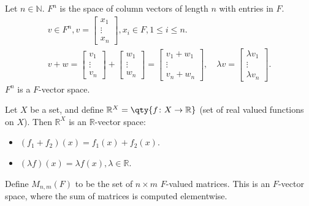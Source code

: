     \begin{example}
        Let $n \in \mathbb{N}$.
        $F^n$ is the space of column vectors of length $n$ with entries in $F$.
        \begin{gather*}
            v \in F^n, v = \begin{bmatrix} x_1 \\ \vdots \\ x_n\end{bmatrix}, x_i \in F, 1 \leq i \leq n. \\
            v + w = \begin{bmatrix}v_1 \\ \vdots \\ v_n\end{bmatrix} + \begin{bmatrix}w_1 \\ \vdots \\ w_n\end{bmatrix} = \begin{bmatrix}v_1 + w_1 \\ \vdots \\ v_n + w_n\end{bmatrix},\quad \lambda v = \begin{bmatrix} \lambda v_1 \\ \vdots \\ \lambda v_n\end{bmatrix}.
        \end{gather*} 
        $F^n$ is a $F$-vector space.
    \end{example} 

    \begin{example}
        Let $X$ be a set, and define $\mathbb R^X = \qty{ f \colon X \to \mathbb R}$ (set of real valued functions on $X$).
        Then $\mathbb R^X$ is an $\mathbb R$-vector space:
        \begin{itemize}
            \item $(f_1 + f_2)(x) = f_1(x) + f_2(x)$.
            \item $(\lambda f)(x) = \lambda f(x), \lambda \in \mathbb{R}$.
        \end{itemize} 
    \end{example}

    \begin{example}
        Define $M_{n,m}(F)$ to be the set of $n \times m$ $F$-valued matrices.
        This is an $F$-vector space, where the sum of matrices is computed elementwise.
    \end{example}

